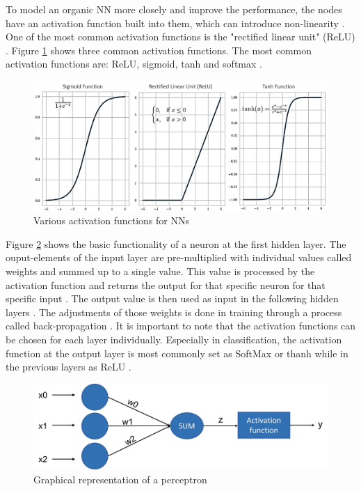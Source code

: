 To model an organic NN more closely and improve the performance, the nodes have an activation function built into them, which can introduce non-linearity \cite{Goyal}. One of the most common activation functions is the "rectified linear unit" (ReLU) \cite{Goodfellow}. Figure \ref{fig:AF} shows three common activation functions. The most common activation functions are: ReLU, sigmoid, tanh and softmax \cite{Activation}.

\begin{figure}[H]
	\centering
	\includegraphics[width=0.8\linewidth]{IMGs/Active.png}
	\caption{Various activation functions for NNs \cite{Activation}}
	\label{fig:AF}
\end{figure}

Figure \ref{fig:PC} shows the basic functionality of a neuron at the first hidden layer. The ouput-elements of the input layer are pre-multiplied with individual values called weights and summed up to a single value. This value is processed by the activation function and returns the output for that specific neuron for that specific input \cite{BattaMahesh}. The output value is then used as input in the following hidden layers \cite{Ding}. The adjustments of those weights is done in training through a process called back-propagation \cite{Chauvin}. 
It is important to note that the activation functions can be chosen for each layer individually. Especially in classification, the activation function at the output layer is most commonly set as SoftMax or thanh while in the previous layers as ReLU \cite{Asadi}. 

\begin{figure}[H]
	\centering
	\includegraphics[width=0.8\linewidth]{IMGs/PEC.png}
	\caption{Graphical representation of a perceptron \cite{Ding}}
	\label{fig:PC}
\end{figure}

